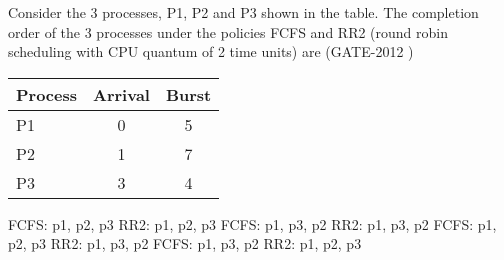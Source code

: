 \begin{questyle}

  \question Consider the 3 processes, P1, P2 and P3 shown in the table. The completion order of the 3 processes
            under the policies FCFS and RR2 (round robin scheduling with CPU quantum of 2 time units) are (GATE-2012 )

  \begin{myTableStyle}
    \begin{center}
    \begin{tabular}{ |l|c|c| } \hline
        Process &   Arrival & Burst    \\ \hline
        P1      &   0       & 5         \\ \hline
        P2      &   1       & 7         \\ \hline
        P3      &   3       & 4         \\ \hline
    \end{tabular}
    \end{center}
  \end{myTableStyle}
  \vspace{0.08in}

  \begin{choices}
    \choice FCFS: p1, p2, p3  \qquad   RR2: p1, p2, p3
    \choice FCFS: p1, p3, p2  \qquad   RR2: p1, p3, p2
    \CorrectChoice FCFS: p1, p2, p3  \qquad   RR2: p1, p3, p2
    \choice FCFS: p1, p3, p2  \qquad   RR2: p1, p2, p3
  \end{choices}

  \end{questyle}




